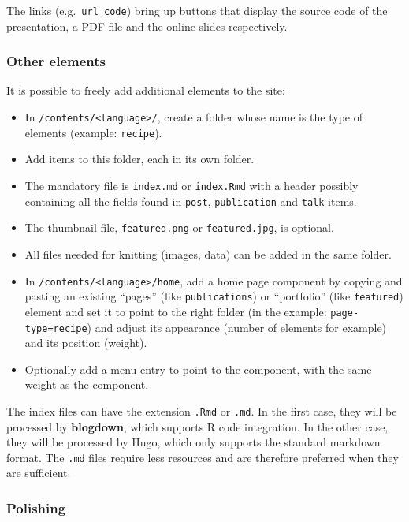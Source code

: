 \documentclass[
  12pt,
  american,
  a4paper,
  extrafontsizes,onecolumn,openright
  ]{memoir}
\providecommand{\tightlist}{%
  \setlength{\itemsep}{0pt}\setlength{\parskip}{0pt}}
\begin{document}
The links (e.g.~\texttt{url\_code}) bring up buttons that display the source code of the presentation, a PDF file and the online slides respectively.

\hypertarget{other-elements}{%
\subsubsection{Other elements}\label{other-elements}}

It is possible to freely add additional elements to the site:

\begin{itemize}
\tightlist
\item
  In \texttt{/contents/\textless{}language\textgreater{}/}, create a folder whose name is the type of elements (example: \texttt{recipe}).
\item
  Add items to this folder, each in its own folder.
\item
  The mandatory file is \texttt{index.md} or \texttt{index.Rmd} with a header possibly containing all the fields found in \texttt{post}, \texttt{publication} and \texttt{talk} items.
\item
  The thumbnail file, \texttt{featured.png} or \texttt{featured.jpg}, is optional.
\item
  All files needed for knitting (images, data) can be added in the same folder.
\item
  In \texttt{/contents/\textless{}language\textgreater{}/home}, add a home page component by copying and pasting an existing \enquote{pages} (like \texttt{publications}) or \enquote{portfolio} (like \texttt{featured}) element and set it to point to the right folder (in the example: \texttt{page-type=recipe}) and adjust its appearance (number of elements for example) and its position (weight).
\item
  Optionally add a menu entry to point to the component, with the same weight as the component.
\end{itemize}

The index files can have the extension \texttt{.Rmd} or \texttt{.md}.
In the first case, they will be processed by \textbf{blogdown}, which supports R code integration.
In the other case, they will be processed by Hugo, which only supports the standard markdown format.
The \texttt{.md} files require less resources and are therefore preferred when they are sufficient.

\hypertarget{polishing}{%
\subsubsection{Polishing}\label{polishing}}
\end{document}
